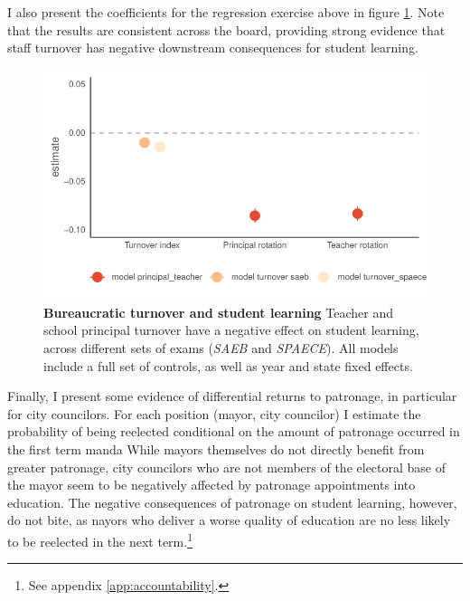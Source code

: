 \documentclass[12pt,a4paper]{article}
\begin{document}
I also present the coefficients for the regression exercise above in figure \ref{fig:hlm_mods}. Note that the results are consistent across the board, providing strong evidence that staff turnover has negative downstream consequences for student learning.

\begin{figure}[h]
  \centering
  \includegraphics{plots/model_turnover_learning.pdf}
  \caption{{\bf Bureaucratic turnover and student learning} Teacher and school principal turnover have a negative effect on student learning, across different sets of exams (\emph{SAEB} and \emph{SPAECE}). All models include a full set of controls, as well as year and state fixed effects.}
  \label{fig:hlm_mods}
\end{figure}

Finally, I present some evidence of differential returns to patronage, in particular for city councilors. For each position (mayor, city councilor) I estimate the probability of being reelected conditional on the amount of patronage occurred in the first term manda While mayors themselves do not directly benefit from greater patronage, city councilors who are not members of the electoral base of the mayor seem to be negatively affected by patronage appointments into education. The negative consequences of patronage on student learning, however, do not bite, as nayors who deliver a worse quality of education are no less likely to be reelected in the next term.\footnote{See appendix \ref{app:accountability}.}
\end{document}
